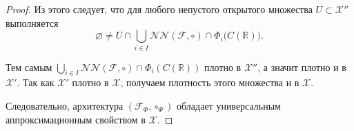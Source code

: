 \documentclass[../NDCNNAI_main.tex]{subfiles}
\begin{document}
\begin{proof}
Из этого следует, что для любого непустого открытого множества
$U\subset\mathcal{X}''$ выполняется
\[
\varnothing \neq
U \cap
\bigcup_{i\in I}
\mathcal{NN}(\mathcal{F},\circ)\cap \Phi_i\bigl(C(\mathbb{R})\bigr).
\]

Тем самым
$\bigcup_{i\in I}\mathcal{NN}(\mathcal{F},\circ)\cap \Phi_i(C(\mathbb{R}))$
плотно в $\mathcal{X}''$, а значит плотно и в $\mathcal{X}'$.
Так как $\mathcal{X}'$ плотно в $\mathcal{X}$, получаем плотность этого
множества и в $\mathcal{X}$.

Следовательно, архитектура $(\mathcal{F}_{\Phi},\circ_{\Phi})$
обладает универсальным аппроксимационным свойством в $\mathcal{X}$.
\end{proof}
\end{document}
